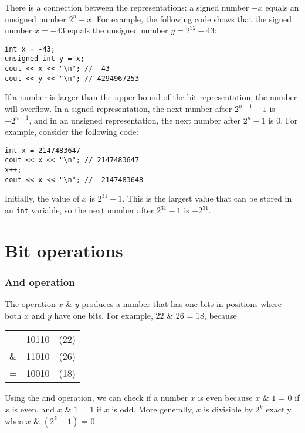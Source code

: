 There is a connection between the
representations:
a signed number $-x$ equals an unsigned number $2^n-x$.
For example, the following code shows that
the signed number $x=-43$ equals the unsigned
number $y=2^{32}-43$:
\begin{lstlisting}
int x = -43;
unsigned int y = x;
cout << x << "\n"; // -43
cout << y << "\n"; // 4294967253
\end{lstlisting}

If a number is larger than the upper bound
of the bit representation, the number will overflow.
In a signed representation,
the next number after $2^{n-1}-1$ is $-2^{n-1}$,
and in an unsigned representation,
the next number after $2^n-1$ is $0$.
For example, consider the following code:
\begin{lstlisting}
int x = 2147483647
cout << x << "\n"; // 2147483647
x++;
cout << x << "\n"; // -2147483648
\end{lstlisting}

Initially, the value of $x$ is $2^{31}-1$.
This is the largest value that can be stored
in an \texttt{int} variable,
so the next number after $2^{31}-1$ is $-2^{31}$.


\section{Bit operations}

\newcommand\XOR{\mathbin{\char`\^}}

\subsubsection{And operation}


The  operation $x$ \& $y$ produces a number
that has one bits in positions where both
$x$ and $y$ have one bits.
For example, $22$ \& $26$ = 18, because

\begin{center}
\begin{tabular}{rrr}
& 10110 & (22)\\
\& & 11010 & (26) \\
\hline
 = & 10010 & (18) \\
\end{tabular}
\end{center}

Using the and operation, we can check if a number
$x$ is even because
$x$ \& $1$ = 0 if $x$ is even, and
$x$ \& $1$ = 1 if $x$ is odd.
More generally, $x$ is divisible by $2^k$
exactly when $x$ \& $(2^k-1)$ = 0.

